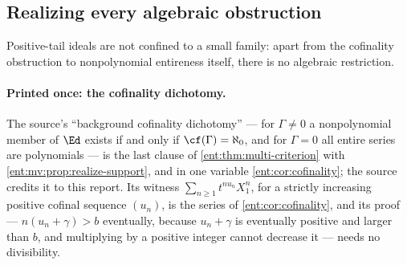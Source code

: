 \documentclass[11pt]{article}
\theoremstyle{plain}
\theoremstyle{plain}
\theoremstyle{plain}
\theoremstyle{definition}
\theoremstyle{definition}
\theoremstyle{definition}
\theoremstyle{definition}
\theoremstyle{remark}
\begin{document}
\subsection{Realizing every algebraic obstruction}
\label{ent:as:subsec:realization}

Positive-tail ideals are not confined to a small family: apart from the
cofinality obstruction to nonpolynomial entireness itself, there is no
algebraic restriction.

\paragraph{Printed once: the cofinality dichotomy.} The source's
``background cofinality dichotomy'' --- for $\Gamma\ne0$ a nonpolynomial member
of $\Ed$ exists if and only if $\cf(\Gamma)=\aleph_0$, and for $\Gamma=0$ all
entire series are polynomials --- is the last clause of
\cref{ent:thm:multi-criterion} with \cref{ent:mv:prop:realize-support}, and in
one variable \cref{ent:cor:cofinality}; the source credits it to this report.
Its witness $\sum_{n\ge1}t^{nu_n}X_1^n$, for a strictly increasing positive
cofinal sequence $(u_n)$, is the series of \cref{ent:cor:cofinality}, and its
proof --- $n(u_n+\gamma)>b$ eventually, because $u_n+\gamma$ is eventually
positive and larger than $b$, and multiplying by a positive integer cannot
decrease it --- needs no divisibility.
\end{document}

